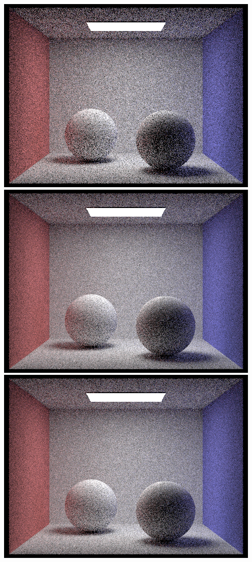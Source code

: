 \documentclass{article}
\begin{document}
\begin{center}
    \includegraphics[width=\textwidth]{task4/spheres_8_4.png}
    \includegraphics[width=\textwidth]{task4/spheres_16_4.png}
    \includegraphics[width=\textwidth]{task4/spheres_16_4.png}

\end{center}
\end{document}
